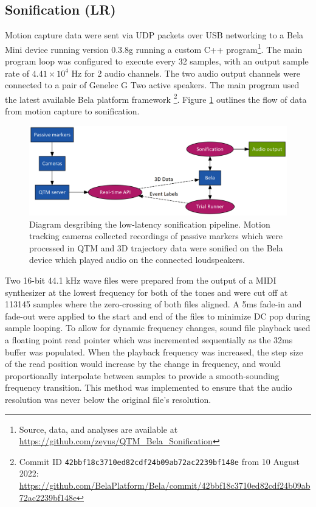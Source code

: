\documentclass[10pt,a4paper,onecolumn]{article}
\begin{document}
\hypertarget{sonification-lr}{%
\subsection{Sonification (LR)}\label{sonification-lr}}

Motion capture data were sent via UDP packets over USB networking to a Bela Mini device running version 0.3.8g running a custom C++ program\footnote{Source, data, and analyses are available at \url{https://github.com/zeyus/QTM_Bela_Sonification}}. The main program loop was configured to execute every 32 samples, with an output sample rate of \ensuremath{4.41\times 10^{4}} Hz for 2 audio channels. The two audio output channels were connected to a pair of Genelec G Two active speakers. The main program used the latest available Bela platform framework \footnote{Commit ID \texttt{42bbf18c3710ed82cdf24b09ab72ac2239bf148e} from 10 August 2022: \url{https://github.com/BelaPlatform/Bela/commit/42bbf18c3710ed82cdf24b09ab72ac2239bf148e}}. Figure \ref{fig:exp-graph} outlines the flow of data from motion capture to sonification.

\begin{figure}[h]

{\centering \includegraphics[width=1\linewidth]{figures/exp-graph} 

}

\caption{Diagram desgribing the low-latency sonification pipeline. Motion tracking cameras collected recordings of passive markers which were processed in QTM and 3D trajectory data were sonified on the Bela device which played audio on the connected loudspeakers.}\label{fig:exp-graph}
\end{figure}

Two 16-bit 44.1 kHz wave files were prepared from the output of a MIDI synthesizer at the lowest frequency for both of the tones and were cut off at 113145 samples where the zero-crossing of both files aligned. A 5ms fade-in and fade-out were applied to the start and end of the files to minimize DC pop during sample looping. To allow for dynamic frequency changes, sound file playback used a floating point read pointer which was incremented sequentially as the 32ms buffer was populated. When the playback frequency was increased, the step size of the read position would increase by the change in frequency, and would proportionally interpolate between samples to provide a smooth-sounding frequency transition. This method was implemented to ensure that the audio resolution was never below the original file's resolution.
\end{document}
